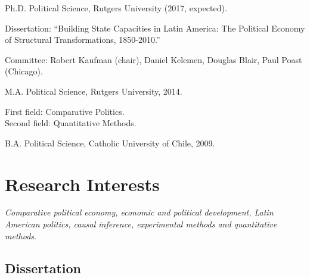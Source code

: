 \documentclass[letterpaper]{article}
\renewenvironment{itemize}{
  \begin{list}{}{
    \setlength{\leftmargin}{1.5em}
  }
}{
  \end{list}
}
\begin{document}
\begin{itemize}
  \item Ph.D. Political Science, Rutgers University (2017, expected).

    	\begin{itemize}

		\item Dissertation: ``Building State Capacities in Latin America: The Political Economy of Structural Transformations, 1850-2010.''

		\item Committee: Robert Kaufman (chair), Daniel Kelemen, Douglas Blair, Paul Poast (Chicago).
		\end{itemize}

  \item M.A. Political Science, Rutgers University, 2014.

  	\begin{itemize}
  	
  		\item 	First field: {\small Comparative Politics}. \\ 
  				Second field: {\small Quantitative Methods}.
	\end{itemize}


  \item B.A. Political Science, Catholic University of Chile, 2009.
\end{itemize}


%


\section*{Research Interests}

\emph{Comparative political economy, economic and political development, Latin American politics, causal inference, experimental methods and quantitative methods}.

\subsection*{Dissertation}
\end{document}
